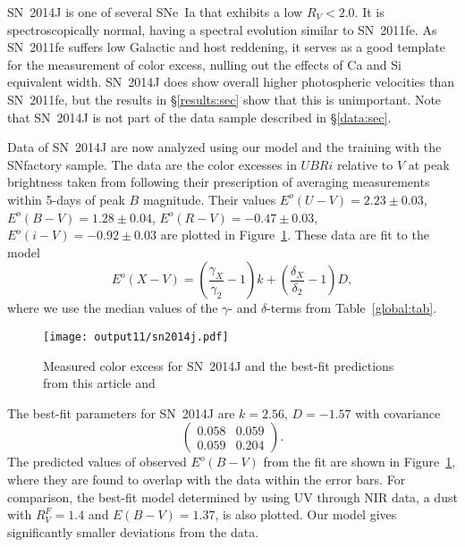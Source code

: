 \documentclass{aastex}   	%
\begin{document}
SN~2014J \citep{2014ApJ...788L..21A}  is one of several SNe~Ia that exhibits a low $R_V<2.0$.
It is spectroscopically normal, having a spectral evolution similar to SN~2011fe.
As SN~2011fe suffers low Galactic and host reddening, it serves as a good template
for the measurement of color excess, nulling out the effects of Ca and Si equivalent width.
SN~2014J does show
overall higher photospheric velocities than SN~2011fe, but the results in \S\ref{results:sec} show that this is unimportant.
Note that SN~2014J is not part of the data sample described in \S\ref{data:sec}.

Data of SN~2014J are now analyzed using our model and the training with the SNfactory sample.
The data are the color excesses  in $UBRi$  relative to $V$ at peak brightness  taken from \citet{2014ApJ...788L..21A}
following their prescription of averaging measurements within 5-days of peak $B$ magnitude.
Their values 
$E^o(U-V) =   2.23 \pm   0.03$,
$E^o(B-V) =   1.28 \pm   0.04$,
$E^o(R-V) =  -0.47 \pm   0.03$,
$E^o(i-V) =  -0.92 \pm   0.03$
are plotted in Figure~\ref{sn2014j:fig}.
These data are fit to the model
\begin{equation}
E^o(X-V) =  \left(\frac{\gamma_X}{\gamma_2}-1\right)k +  \left(\frac{\delta_X}{\delta_2}-1\right)D,
\end{equation}
where we use the median values of the $\gamma$- and $\delta$-terms from Table~\ref{global:tab}.

\begin{figure}[htbp] %
   \centering
   \texttt{[image: output11/sn2014j.pdf]} 
   \caption{Measured color excess for SN~2014J and the best-fit predictions from this article and  \citet{2014ApJ...788L..21A}  
   \label{sn2014j:fig}}
\end{figure}

The best-fit parameters for SN~2014J are $k= 2.56$, $ D=-1.57$ with covariance
\begin{equation}
\begin{pmatrix}
0.058 & 0.059 \\
0.059 & 0.204
\end{pmatrix}.
\end{equation}
The predicted values of observed $E^o(B-V)$ from the fit are shown in Figure~\ref{sn2014j:fig}, where they are found to
overlap with the data within the error bars.   For comparison, the best-fit model determined by  \citet{2014ApJ...788L..21A} using
UV through NIR data,
a  \citet{1999PASP..111...63F} dust with $R_V^F=1.4$ and $E(B-V)=1.37$, 
is also plotted.  Our model gives significantly smaller deviations from the data.
\end{document}
